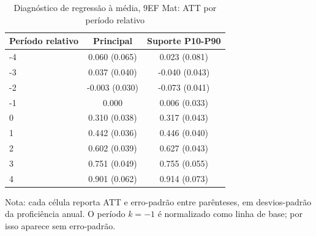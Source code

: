 \begin{table}[!htbp]
\centering
\caption{Diagnóstico de regressão à média, 9EF Mat: ATT por período relativo}
\label{tab:ap_event_regmedia_9ef_mat}
\vspace{-0.15cm}
\scriptsize
\setlength{\tabcolsep}{4pt}
\renewcommand{\arraystretch}{0.92}
\begin{tabular}{lcc}
\toprule
Período relativo & Principal & Suporte P10-P90 \\
\midrule
-4 & 0.060 (0.065) & 0.023 (0.081) \\
-3 & 0.037 (0.040) & -0.040 (0.043) \\
-2 & -0.003 (0.030) & -0.073 (0.041) \\
-1 & 0.000 & 0.006 (0.033) \\
0 & 0.310 (0.038) & 0.317 (0.043) \\
1 & 0.442 (0.036) & 0.446 (0.040) \\
2 & 0.602 (0.039) & 0.627 (0.043) \\
3 & 0.751 (0.049) & 0.755 (0.055) \\
4 & 0.901 (0.062) & 0.914 (0.073) \\
\bottomrule
\end{tabular}
\begin{flushleft}
\footnotesize Nota: cada célula reporta ATT e erro-padrão entre parênteses, em desvios-padrão da proficiência anual. O período \(k=-1\) é normalizado como linha de base; por isso aparece sem erro-padrão.
\end{flushleft}
\end{table}
